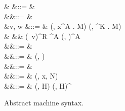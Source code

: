 \documentclass[12pt,phd,lfcs,twoside,openright,logo,leftchapter,normalheadings]{infthesis}
\theoremstyle{plain}
\theoremstyle{definition}
\begin{document}
\begin{figure}[t]
\flushleft
\begin{syntax}
           & \conf &::= &  \\
       &\env   &::= & \emptyset \mid \env[x \mapsto v] \\
                   &v, w   &::= & (\env, \lambda x^A . M) \mid (\env, \Lambda \alpha^K . M) \\
                                &       &\mid& \Record{} \mid {} \mid (\ell\, v)^R \mid \shk^A \mid (\shk, \slk)^A \medskip\\
            &\shk   &::= & \nil \mid \shf \cons \shk \\
      &\shf   &::= & (\slk, \chi) \\
       &\slk   &::= & \nil \mid \slf \cons \slk \\
 &\slf   &::= & (\env, x, N) \\
         &\chi   &::= & (\env, H) \mid (\env, H)^\dagger \medskip \\
\end{syntax}

\caption{Abstract machine syntax.}
\label{fig:abstract-machine-syntax}
\end{figure}
\end{document}
